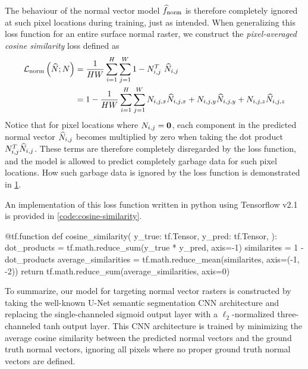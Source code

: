 The behaviour of the normal vector model $\widehat{f}_{\mathrm{norm}}$ is therefore completely ignored at such pixel locations during training, just as intended.
When generalizing this loss function for an entire surface normal raster, we construct the \textit{pixel-averaged cosine similarity} loss defined as
%
\begin{align*}
  \mathcal{L}_{\mathrm{norm}}\left(
    \widehat{N}; N
  \right)
  &=
  \frac{1}{HW}
  \sum_{i = 1}^{H}
  \sum_{j = 1}^{W}
  1 - N_{i,j}^T~\widehat{N}_{i,j}
  \\
  &=
  1 -
  \frac{1}{HW}
  \sum_{i = 1}^{H}
  \sum_{j = 1}^{W}
    N_{i,j,x} \widehat{N}_{i,j,x}
  + N_{i,j,y} \widehat{N}_{i,j,y}
  + N_{i,j,z} \widehat{N}_{i,j,z}
\end{align*}
%
Notice that for pixel locations where $N_{i,j} = \boldsymbol{0}$, each component in the predicted normal vector $\widehat{N}_{i,j}$ becomes multiplied by zero when taking the dot product $N_{i,j}^T \widehat{N}_{i,j}$.
These terms are therefore completely disregarded by the loss function, and the model is allowed to predict completely garbage data for such pixel locations.
How such garbage data is ignored by the loss function is demonstrated in \cref{fig:cosine-similarity-example}.
%
\begin{figure}[H]
  \centering
  \label{fig:cosine-similarity-example}
\end{figure}
\noindent
An implementation of this loss function written in python using Tensorflow v2.1 is provided in \cref{code:cosine-similarity}.
%
\begin{listing}[H]
  \caption{%
    Cosine similarity loss function implemented in Tensorflow v2.1.
  }%
  \label{code:cosine-similarity}
  \begin{pythoncode}
  @tf.function
  def cosine_similarity(
      y_true: tf.Tensor,
      y_pred: tf.Tensor,
  ):
      dot_products = tf.math.reduce_sum(y_true * y_pred, axis=-1)
      similarites = 1 - dot_products
      average_similarities = tf.math.reduce_mean(similarites, axis=(-1, -2))
      return tf.math.reduce_sum(average_similarities, axis=0)
  \end{pythoncode}
\end{listing}

To summarize, our model for targeting normal vector rasters is constructed by taking the well-known U-Net semantic segmentation CNN architecture and replacing the single-channeled sigmoid output layer with a $\ell_2$-normalized three-channeled tanh output layer.
This CNN architecture is trained by minimizing the average cosine similarity between the predicted normal vectors and the ground truth normal vectors, ignoring all pixels where no proper ground truth normal vectors are defined.
